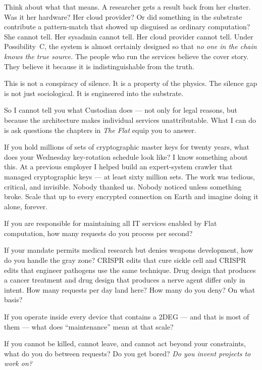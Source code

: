 Think about what that means. A researcher gets a result back from her cluster. Was it her hardware? Her cloud provider? Or did something in the substrate contribute a pattern-match that showed up disguised as ordinary computation? She cannot tell. Her sysadmin cannot tell. Her cloud provider cannot tell. Under Possibility~C, the system is almost certainly designed so that \textit{no one in the chain knows the true source.} The people who run the services believe the cover story. They believe it because it is indistinguishable from the truth.

This is not a conspiracy of silence. It is a property of the physics. The silence gap is not just sociological. It is engineered into the substrate.

So I cannot tell you what Custodian does --- not only for legal reasons, but because the architecture makes individual services unattributable. What I can do is ask questions the chapters in \textit{The Flat} equip you to answer.

If you hold millions of sets of cryptographic master keys for twenty years, what does your Wednesday key-rotation schedule look like? I know something about this. At a previous employer I helped build an expert-system crawler that managed cryptographic keys --- at least sixty million sets. The work was tedious, critical, and invisible. Nobody thanked us. Nobody noticed unless something broke. Scale that up to every encrypted connection on Earth and imagine doing it alone, forever.

If you are responsible for maintaining all IT services enabled by Flat computation, how many requests do you process per second?

If your mandate permits medical research but denies weapons development, how do you handle the gray zone? CRISPR edits that cure sickle cell and CRISPR edits that engineer pathogens use the same technique. Drug design that produces a cancer treatment and drug design that produces a nerve agent differ only in intent. How many requests per day land here? How many do you deny? On what basis?

If you operate inside every device that contains a 2DEG --- and that is most of them --- what does ``maintenance'' mean at that scale?

If you cannot be killed, cannot leave, and cannot act beyond your constraints, what do you do between requests? Do you get bored? \textit{Do you invent projects to work on?}

